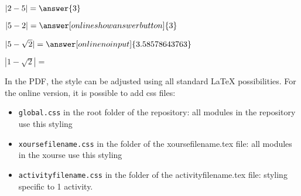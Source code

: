 \documentclass{ximera}
\begin{document}
\begin{exercise} \nl 

    \begin{xmmulticols}
    \begin{question} $|2-5| = \answer{3}$ \end{question}
    \begin{question} $|5-2| = \answer[onlineshowanswerbutton]{3}$ \end{question}
    \begin{question} $|5-\sqrt{2}| = \answer[onlinenoinput]{3.58578643763}$ \end{question}
    \begin{question} 
        $|1-\sqrt{2}| = $
    \end{question}
    \end{xmmulticols}
\end{exercise}


In the PDF, the style can be adjusted using all standard LaTeX possibilities. For the online version, it is possible to add css files:
	\begin{itemize}
		\item \verb|global.css| in the root folder of the repository: all modules in the repository use this styling
		\item \verb|xoursefilename.css| in the folder of the xoursefilename.tex file: all modules in the xourse use this styling
		\item \verb|activityfilename.css| in the folder of the activityfilename.tex file: styling specific to 1 activity.
	\end{itemize}
\end{document}
